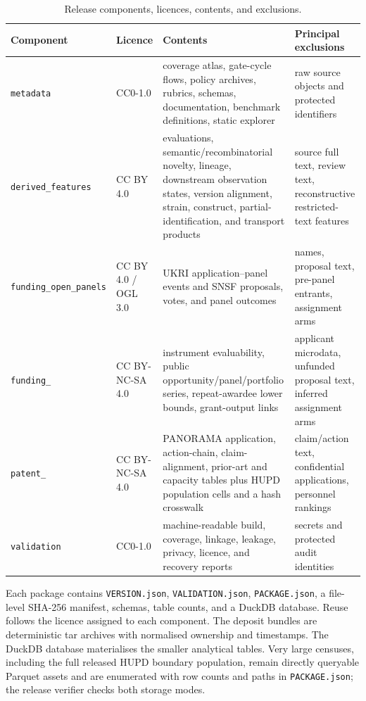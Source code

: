 \documentclass[
  10pt,
]{article}
\begin{document}
{\small
\begin{longtable}[]{@{}L{0.16\textwidth}L{0.13\textwidth}L{0.35\textwidth}L{0.26\textwidth}@{}}
\caption{Release components, licences, contents, and exclusions.}\\
\toprule\noalign{}
Component & Licence & Contents & Principal exclusions \\
\midrule\noalign{}
\endhead
\bottomrule\noalign{}
\endlastfoot
\texttt{metadata} & CC0-1.0 & coverage atlas, gate-cycle flows, policy
archives, rubrics, schemas, documentation, benchmark definitions, static
explorer & raw source objects and protected identifiers \\
\texttt{derived\_}\newline\texttt{features} & CC BY 4.0 & evaluations,
semantic/recombinatorial novelty, lineage, downstream observation states, version alignment,
strain, construct, partial-identification, and transport products & source full text, review text,
reconstructive restricted-text features \\
\texttt{funding\_}\newline\texttt{open\_panels} & CC BY 4.0 / OGL 3.0
& UKRI application--panel events and SNSF proposals, votes, and panel
outcomes & names, proposal text, pre-panel entrants, assignment arms \\
\texttt{funding\_} & CC BY-NC-SA 4.0 & instrument
evaluability, public opportunity/panel/portfolio series, repeat-awardee
lower bounds, grant-output links & applicant microdata, unfunded
proposal text, inferred assignment arms \\
\texttt{patent\_} & CC BY-NC-SA 4.0 & PANORAMA application,
action-chain, claim-alignment, prior-art and capacity tables plus HUPD
population cells and a hash crosswalk & claim/action text, confidential applications, personnel
rankings \\
\texttt{validation} & CC0-1.0 & machine-readable build, coverage,
linkage, leakage, privacy, licence, and recovery reports & secrets and
protected audit identities \\
\end{longtable}
}

Each package contains \texttt{VERSION.json}, \texttt{VALIDATION.json},
\texttt{PACKAGE.json}, a file-level SHA-256 manifest, schemas, table
counts, and a DuckDB database. Reuse follows the licence assigned to
each component. The deposit bundles are deterministic tar
archives with normalised ownership and timestamps.
The DuckDB database materialises the smaller analytical tables. Very
large censuses, including the full released HUPD boundary population, remain
directly queryable Parquet assets and are enumerated with row counts and
paths in \texttt{PACKAGE.json}; the release verifier checks both storage
modes.
\end{document}
